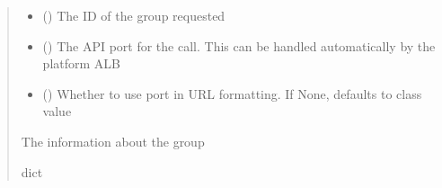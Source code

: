 \documentclass[letterpaper,10pt,english]{sphinxmanual}
\begin{document}
\begin{fulllineitems}
\begin{fulllineitems}
\begin{sphinxVerbatim}[commandchars=\\\{\}]
 
  
\end{sphinxVerbatim}
\begin{quote}\begin{description}
\begin{itemize}
\item {} 
\sphinxAtStartPar
{} () \textendash{} The ID of the group requested

\item {} 
\sphinxAtStartPar
{} (\sphinxstyleliteralemphasis{\sphinxupquote{ (}}\sphinxstyleliteralemphasis{\sphinxupquote{)}}) \textendash{} The API port for the call. This can be handled automatically by the platform ALB

\item {} 
\sphinxAtStartPar
{} (\sphinxstyleliteralemphasis{\sphinxupquote{ (}}\sphinxstyleliteralemphasis{\sphinxupquote{)}}) \textendash{} Whether to use port in URL formatting. If None, defaults to class value

\end{itemize}

\sphinxAtStartPar
{} \textendash{} The information about the group

\sphinxAtStartPar
dict

\end{description}\end{quote}


\end{fulllineitems}
\end{fulllineitems}
\end{document}
